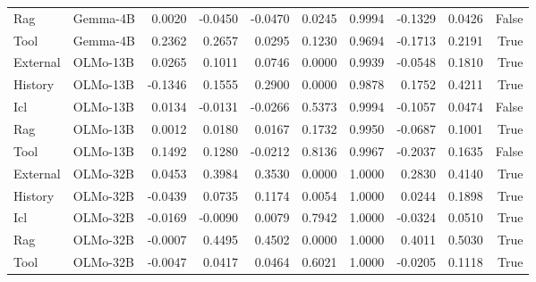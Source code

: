 \begin{tabular}{llrrrrrrrr}
Rag & Gemma-4B & 0.0020 & -0.0450 & -0.0470 & 0.0245 & 0.9994 & -0.1329 & 0.0426 & False \\
Tool & Gemma-4B & 0.2362 & 0.2657 & 0.0295 & 0.1230 & 0.9694 & -0.1713 & 0.2191 & True \\
External & OLMo-13B & 0.0265 & 0.1011 & 0.0746 & 0.0000 & 0.9939 & -0.0548 & 0.1810 & True \\
History & OLMo-13B & -0.1346 & 0.1555 & 0.2900 & 0.0000 & 0.9878 & 0.1752 & 0.4211 & True \\
Icl & OLMo-13B & 0.0134 & -0.0131 & -0.0266 & 0.5373 & 0.9994 & -0.1057 & 0.0474 & False \\
Rag & OLMo-13B & 0.0012 & 0.0180 & 0.0167 & 0.1732 & 0.9950 & -0.0687 & 0.1001 & True \\
Tool & OLMo-13B & 0.1492 & 0.1280 & -0.0212 & 0.8136 & 0.9967 & -0.2037 & 0.1635 & False \\
External & OLMo-32B & 0.0453 & 0.3984 & 0.3530 & 0.0000 & 1.0000 & 0.2830 & 0.4140 & True \\
History & OLMo-32B & -0.0439 & 0.0735 & 0.1174 & 0.0054 & 1.0000 & 0.0244 & 0.1898 & True \\
Icl & OLMo-32B & -0.0169 & -0.0090 & 0.0079 & 0.7942 & 1.0000 & -0.0324 & 0.0510 & True \\
Rag & OLMo-32B & -0.0007 & 0.4495 & 0.4502 & 0.0000 & 1.0000 & 0.4011 & 0.5030 & True \\
Tool & OLMo-32B & -0.0047 & 0.0417 & 0.0464 & 0.6021 & 1.0000 & -0.0205 & 0.1118 & True \\
\bottomrule
\end{tabular}
